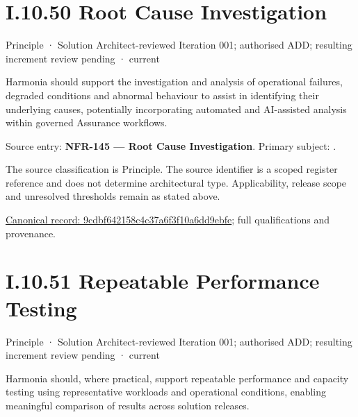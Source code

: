 \section*{I.10.50 Root Cause Investigation}
\label{navigation:I.10.50}

\label{element:9cdbf642158c4c37a6f3f10a6dd9ebfe}
{\small Principle · Solution Architect-reviewed Iteration 001; authorised ADD; resulting increment review pending · current}\par

Harmonia should support the investigation and analysis of operational failures, degraded conditions and abnormal behaviour to assist in identifying their underlying causes, potentially incorporating automated and AI-assisted analysis within governed Assurance workflows.



Source entry: \textbf{NFR-145 — Root Cause Investigation}. Primary subject: \texttt{}.



The source classification is Principle. The source identifier is a scoped register reference and does not determine architectural type. Applicability, release scope and unresolved thresholds remain as stated above.


{\footnotesize \href{../../../../../../../../continuum/motivation/principle/9cdbf642158c4c37a6f3f10a6dd9ebfe.md}{Canonical record: 9cdbf642158c4c37a6f3f10a6dd9ebfe}; full qualifications and provenance.}\par
\section*{I.10.51 Repeatable Performance Testing}
\label{navigation:I.10.51}

\label{element:1c2eb4d9aef4425288528907fed7ebc2}
{\small Principle · Solution Architect-reviewed Iteration 001; authorised ADD; resulting increment review pending · current}\par

Harmonia should, where practical, support repeatable performance and capacity testing using representative workloads and operational conditions, enabling meaningful comparison of results across solution releases.



